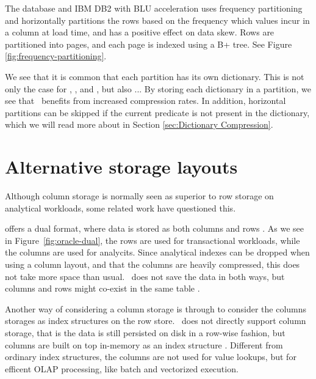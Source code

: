 The  database and IBM DB2 with BLU acceleration  \cite{Barber2012-xt, Raman2013-em, Raman2008-gi} uses frequency partitioning and horizontally partitions the rows based on the frequency which values incur in a column at load time, and has a positive effect on data skew. Rows are partitioned into pages, and each page is indexed using a B+ tree. See Figure \ref{fig:frequency-partitioning}.

We see that it is common that each partition has its own dictionary. This is not only the case for \mssql, \oracle, and \blink, but also ... By storing each dictionary in a partition, we see that \blink~benefits from increased compression rates. In addition, horizontal partitions can be skipped if the current predicate is not present in the dictionary, which we will read more about in Section \ref{sec:Dictionary Compression}.

\section{Alternative storage layouts}
\label{sec:Alternative storage layouts}
Although column storage is normally seen as superior to row storage on analytical workloads, some related work have questioned this.

\oracle offers a dual format, where data is stored as both columns and rows \cite{Lahiri2015-mz}. As we see in Figure~\ref{fig:oracle-dual}, the rows are used for transactional workloads, while the columns are used for analycits. Since analytical indexes can be dropped when using a column layout, and that the columns are heavily compressed, this does not take more space than usual. \ibm~does not save the data in both ways, but columns and rows might co-exist in the same table \cite{Raman2013-em}.

Another way of considering a column storage is through to consider the columns storages as index structures on the row store. \mssql~does not directly support column storage, that is the data is still persisted on disk in a row-wise fashion, but columns are built on top in-memory as an index structure \cite{noauthor_undated-vq}. Different from ordinary index structures, the columns are not used for value lookups, but for efficent OLAP processing, like batch and vectorized execution. 

